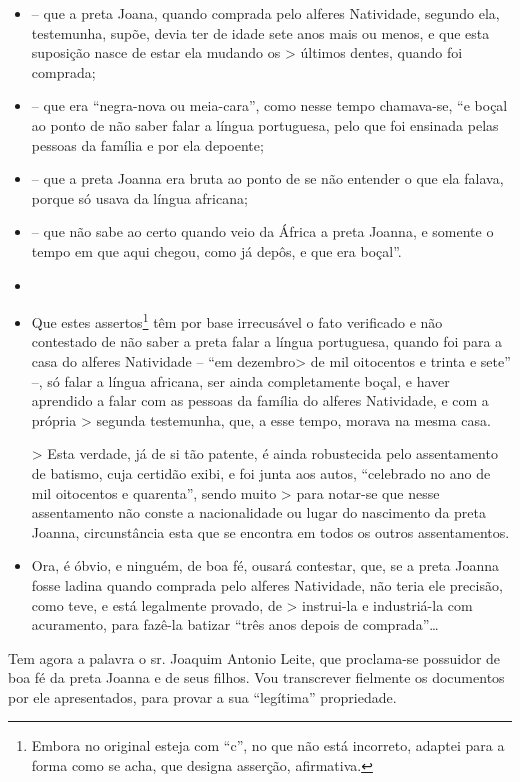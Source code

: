 \begin{itemize}
\item
  -- que a preta Joana, quando comprada pelo alferes Natividade, segundo
  ela, testemunha, supõe, devia ter de idade sete anos mais ou menos, e
  que esta suposição nasce de estar ela mudando os \textgreater{}
  últimos dentes, quando foi comprada;
\item
  -- que era ``negra-nova ou meia-cara'', como nesse tempo chamava-se, ``e
  boçal ao ponto de não saber falar a língua portuguesa, pelo que foi
  ensinada pelas pessoas da família e por ela depoente;
\item
  -- que a preta Joanna era bruta ao ponto de se não entender o que ela
  falava, porque só usava da língua africana;
\item
  -- que não sabe ao certo quando veio da África a preta Joanna, e
  somente o tempo em que aqui chegou, como já depôs, e que era boçal''.
\item
\item
  Que estes assertos\footnote{ Embora no original esteja com ``c'', no
    que não está incorreto, adaptei para a forma como se acha, que
    designa asserção, afirmativa.} têm por base irrecusável o fato
  verificado e não contestado de não saber a preta falar a língua
  portuguesa, quando foi para a casa do alferes Natividade -- ``em
  dezembro\textgreater{} de mil oitocentos e trinta e sete'' --, só
  falar a língua africana, ser ainda completamente boçal, e haver
  aprendido a falar com as pessoas da família do alferes Natividade, e
  com a própria \textgreater{} segunda testemunha, que, a esse tempo,
  morava na mesma casa.

  \textgreater{} Esta verdade, já de si tão patente, é ainda robustecida
  pelo assentamento de batismo, cuja certidão exibi, e foi junta aos
  autos, ``celebrado no ano de mil oitocentos e quarenta'', sendo muito
  \textgreater{} para notar-se que nesse assentamento não conste a
  nacionalidade ou lugar do nascimento da preta Joanna, circunstância
  esta que se encontra em todos os outros assentamentos.
\item
  Ora, é óbvio, e ninguém, de boa fé, ousará contestar, que, se a preta
  Joanna fosse ladina quando comprada pelo alferes Natividade, não teria
  ele precisão, como teve, e está legalmente provado, de \textgreater{}
  instrui-la e industriá-la com acuramento, para fazê-la batizar ``três
  anos depois de comprada''\ldots{}
\end{itemize}

Tem agora a palavra o sr. Joaquim Antonio Leite, que proclama-se
possuidor de boa fé da preta Joanna e de seus filhos. Vou transcrever
fielmente os documentos por ele apresentados, para provar a sua
``legítima'' propriedade.

